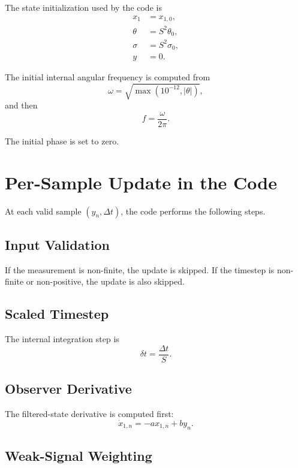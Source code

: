 \documentclass[conference]{IEEEtran}
\begin{document}
The state initialization used by the code is
\begin{align}
  x_1 &= x_{1,0},\\
  \theta &= S^2 \theta_0,\\
  \sigma &= S^2 \sigma_0,\\
  y &= 0.
\end{align}

The initial internal angular frequency is computed from
\begin{equation}
  \omega = \sqrt{\max\!\left(10^{-12}, |\theta|\right)},
\end{equation}
and then
\begin{equation}
  f = \frac{\omega}{2\pi}.
\end{equation}

The initial phase is set to zero.

\section{Per-Sample Update in the Code}

At each valid sample $(y_n,\Delta t)$, the code performs the following steps.

\subsection{Input Validation}

If the measurement is non-finite, the update is skipped. If the timestep is
non-finite or non-positive, the update is also skipped.

\subsection{Scaled Timestep}

The internal integration step is
\begin{equation}
  \delta t = \frac{\Delta t}{S}.
\end{equation}

\subsection{Observer Derivative}

The filtered-state derivative is computed first:
\begin{equation}
  \dot{x}_{1,n} = -a x_{1,n} + b y_n.
\end{equation}

\subsection{Weak-Signal Weighting}
\end{document}

